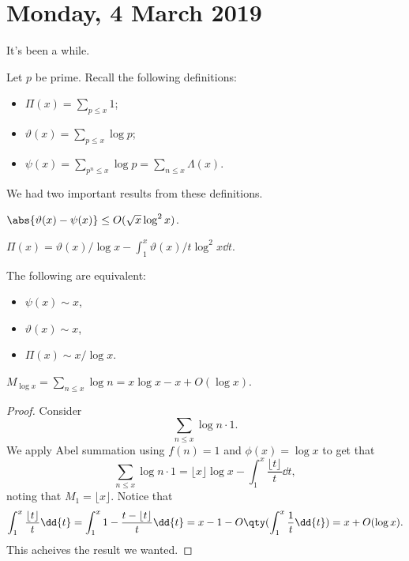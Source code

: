 
\section{Monday, 4 March 2019}

It's been a while.

Let $p$ be prime. Recall the following definitions:
\begin{itemize}
\item $\Pi(x) = \sum_{p \leq x} 1$;
\item $\vartheta(x) = \sum_{p \leq x} \log p$;
\item $\psi(x) = \sum_{p^n \leq x} \log p = \sum_{n \leq x} \Lambda(x)$.
\end{itemize}

We had two important results from these definitions.

\begin{theorem}
$\abs{\vartheta(x) - \psi(x)} \leq O(\sqrt{x}\log^2x)$.
\end{theorem}

\begin{theorem}
$\Pi(x) = \vartheta(x)/\log x - \int_1^x \vartheta(x)/t\log^2x \dd{t}$.
\end{theorem}

\begin{theorem}
The following are equivalent:
\begin{itemize}
\item $\psi(x) \sim x$,
\item $\vartheta(x) \sim x$,
\item $\Pi(x) \sim x/\log x$.
\end{itemize}
\end{theorem}

\begin{lemma}
$M_{\log x} = \sum_{n \leq x} \log n = x\log x - x + O(\log x)$.
\end{lemma}

\begin{proof}
Consider 
\[ \sum_{n \leq x} \log n \cdot 1. \]
We apply Abel summation using $f(n) = 1$ and $\phi(x) = \log x$ to get that 
\[ \sum_{n \leq x} \log n \cdot 1 = \lfloor x \rfloor \log x - \int_1^x \frac{\lfloor t \rfloor}{t} \dd{t}, \]
noting that $M_1 = \lfloor x \rfloor$. Notice that 
\[ \int_1^x \frac{\lfloor t \rfloor}{t} \dd{t} = \int_1^x 1 - \frac{t - \lfloor t \rfloor}{t} \dd{t} = x - 1 - O\qty(\int_1^x \frac{1}{t} \dd{t}) = x + O(\log x). \]
This acheives the result we wanted.
\end{proof}

